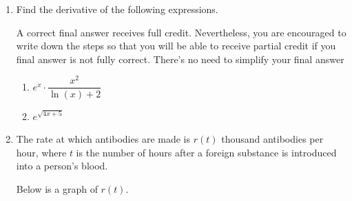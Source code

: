 \documentclass[11pt]{article}
\begin{document}
\begin{enumerate}
\begin{center}
\end{center}


\newpage


\item Find the derivative of the following expressions. 

A correct final answer receives full credit. Nevertheless, you are encouraged to write down the steps so that you will be able to receive partial credit if you final answer is not fully correct. There's no need to simplify your final answer

\begin{enumerate}
\item $e^x\cdot\dfrac{x^2}{\ln(x)+2}$

\vfill

\item $e^{\sqrt{4x+5}}$

\vfill 
\end{enumerate}


\newpage


\item The rate at which antibodies are made is $r(t)$ thousand antibodies per hour, where $t$ is the number of hours after a foreign substance is introduced into a person's blood.

Below is a graph of $r(t)$.

\begin{center}
\end{center}
\end{enumerate}
\end{document}
